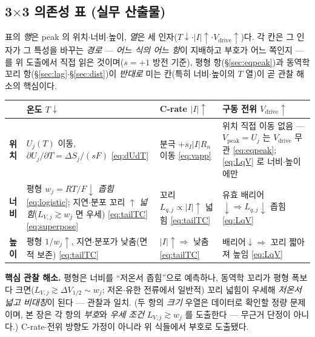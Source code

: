 \documentclass[11pt,a4paper]{article}
\newcommand{\drive}{\mathrm{drive}}
\newcommand{\peak}{\mathrm{peak}}
\begin{document}
\subsection{3$\times$3 의존성 표 (실무 산출물)}
표의 \emph{행}은 peak 의 위치$\cdot$너비$\cdot$높이, \emph{열}은 세 인자($T\downarrow$$\cdot$$|I|\uparrow$$\cdot$$V_\drive\uparrow$)다.
각 칸은 그 인자가 그 특성을 바꾸는 \emph{경로} — \emph{어느 식의 어느 항}이 지배하고 부호가 어느 쪽인지 — 를 위
도출에서 직접 읽은 것이며($s=+1$ 방전 기준), 평형 항(\S\ref{sec:eqpeak})과 동역학 꼬리 항(\S\ref{sec:lag}$\cdot$\S\ref{sec:dist})이
\emph{반대로} 미는 칸(특히 너비$\cdot$높이의 $T$ 열)이 곧 관찰 해소의 핵심이다.
\begin{center}
\renewcommand{\arraystretch}{1.4}
\begin{tabular}{p{} p{} p{} p{}}
\toprule
 & \textbf{온도 $T\downarrow$} & \textbf{C-rate $|I|\uparrow$} & \textbf{구동 전위 $V_\drive\uparrow$} \\
\midrule
\textbf{위치} & $U_j(T)$ 이동, $\partial U_j/\partial T=\Delta S_j/(sF)$ \eqref{eq:dUdT} & 분극 $+s_I|I|R_n$ 이동 \eqref{eq:vapp} & 위치 직접 이동 없음 — $V_\peak=U_j$ 는 $V_\drive$ 무관 \eqref{eq:eqpeak}; \eqref{eq:LqV} 로 너비$\cdot$높이에만 \\
\textbf{너비} & 평형 $w_j=RT/F\downarrow$ \emph{좁힘} \eqref{eq:logistic}; 지연$\cdot$분포 꼬리 $\uparrow$ \emph{넓힘}($L_{V,j}\!\gtrsim\!w_j$ 면 우세) \eqref{eq:tailTC}\eqref{eq:superpose} & 꼬리 $L_{q,j}\propto|I|\uparrow$ 넓힘 \eqref{eq:tailTC} & 유효 배리어$\downarrow\Rightarrow L_{q,j}\downarrow$ 좁힘 \eqref{eq:LqV} \\
\textbf{높이} & 평형 $1/w_j\uparrow$, 지연$\cdot$분포가 낮춤(면적 보존) \eqref{eq:tailTC} & $|I|\uparrow\Rightarrow$ 낮춤 \eqref{eq:tailTC} & 배리어$\downarrow\Rightarrow$ 꼬리 짧아져 높임 \eqref{eq:LqV} \\
\bottomrule
\end{tabular}
\end{center}
\textbf{핵심 관찰 해소.} 평형은 너비를 ``저온서 좁힘''으로 예측하나, 동역학 꼬리가 평형 폭보다 크면($L_{V,j}
\gtrsim\Delta V_{1/2}\sim w_j$; 저온$\cdot$유한 전류에서 일반적) 꼬리 넓힘이 우세해 \emph{저온서 넓고 비대칭}이
된다 — 관찰과 일치. (두 항의 \emph{크기} 우열은 데이터로 확인할 정량 문제이며, 본 장은 각 항의 \emph{부호}와
\emph{우세 조건} $L_{V,j}\gtrsim w_j$ 를 도출한다 — 무근거 단정이 아니다.) C-rate$\cdot$전위 방향도 가정이 아니라
위 식들에서 부호로 도출됐다.
\end{document}
